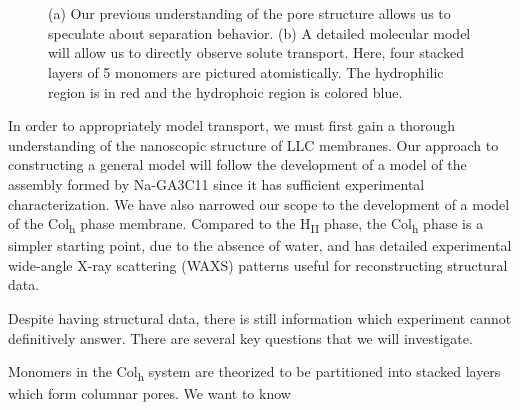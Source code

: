 \documentclass{article}
\begin{document}
\begin{figure}
\begin{subfigure}{0.45\linewidth}
		\caption{}~\label{fig:detailed_pore}
	\end{subfigure}
  \caption{(a) Our previous understanding of the pore structure allows us to speculate
	   about separation behavior. (b) A detailed molecular model will allow us to
	   directly observe solute transport. Here, four stacked layers of 5 monomers
           are pictured atomistically. The hydrophilic region is in red and the 
	   hydrophoic region is colored blue.}~\label{fig:detail}
  \end{figure}
 
  In order to appropriately model transport, we must first gain a thorough
  understanding of the nanoscopic structure of LLC membranes. Our approach to
  constructing a general model will follow the development of a model of the
  assembly formed by Na-GA3C11 since it has sufficient experimental
  characterization. We have also narrowed our scope to the development of a model
  of the Col\textsubscript{h} phase membrane. Compared to the H\textsubscript{II}
  phase, the Col\textsubscript{h} phase is a simpler starting point, due to the
  absence of water, and has detailed experimental wide-angle X-ray scattering
  (WAXS) patterns useful for reconstructing structural data.  

  Despite having structural data, there is still information which experiment
  cannot definitively answer. There are several key questions that we will
  investigate.


  Monomers in the Col\textsubscript{h} system are theorized to be partitioned
  into stacked layers which form columnar pores. We want to know 
\end{document}
